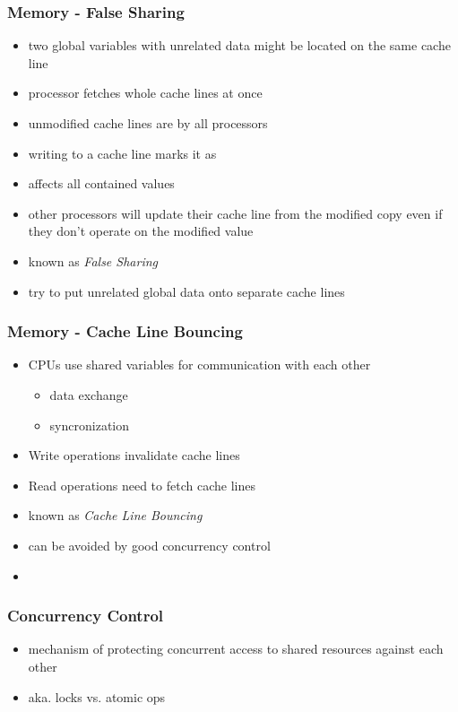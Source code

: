 \begin{frame}
 \frametitle{Memory - False Sharing}
 \begin{itemize}
  \item two global variables with unrelated data might be located on the same cache line
  \item processor fetches whole cache lines at once
  \item unmodified cache lines are  by all processors
  \item writing to a cache line marks it as 
  \item affects all contained values
  \item other processors will update their cache line from the modified copy even if they don't operate on the modified value
  \item known as \textit{False Sharing}
  \item try to put unrelated global data onto separate cache lines
 \end{itemize}
\end{frame}

\begin{frame}
 \frametitle{Memory - Cache Line Bouncing}
 \begin{itemize}
  \item CPUs use shared variables for communication with each other
   \begin{itemize}
    \item data exchange
    \item syncronization
   \end{itemize}
  \item Write operations invalidate cache lines
  \item Read operations need to fetch cache lines
  \item known as \textit{Cache Line Bouncing}
  \item can be avoided by good concurrency control
  \item {}
 \end{itemize}
\end{frame}

\begin{frame}
 \frametitle{Concurrency Control}
 \begin{itemize}
  \item mechanism of protecting concurrent access to shared resources against each other
  \item aka. locks vs. atomic ops
 \end{itemize}
\end{frame}

